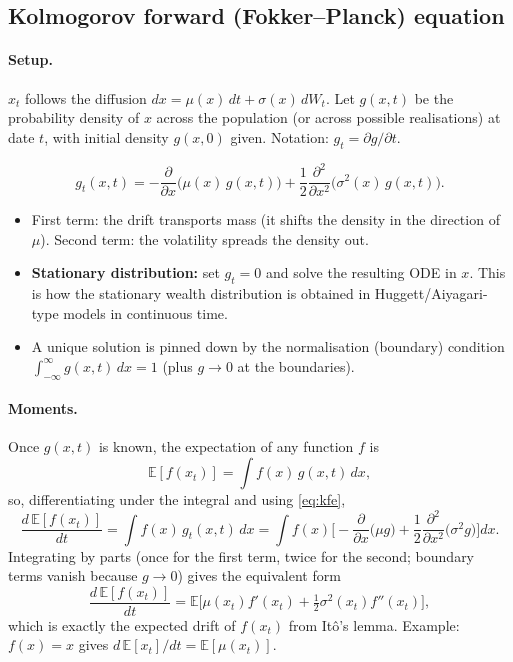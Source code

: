 \subsection{Kolmogorov forward (Fokker--Planck) equation }

\paragraph{Setup.} $x_t$ follows the diffusion $dx=\mu(x)\,dt+\sigma(x)\,dW_t$. Let $g(x,t)$ be the probability density of $x$ across the population (or across possible realisations) at date $t$, with initial density $g(x,0)$ given. Notation: $g_t=\partial g/\partial t$.

\begin{keybox}[title={Kolmogorov forward equation (KFE, also called Fokker--Planck, KFP)}]
\begin{equation}\label{eq:kfe}
g_t(x,t)=-\frac{\partial}{\partial x}\big(\mu(x)\,g(x,t)\big)+\frac12\frac{\partial^2}{\partial x^2}\big(\sigma^2(x)\,g(x,t)\big).
\end{equation}
\end{keybox}
\begin{itemize}
\item First term: the drift transports mass (it shifts the density in the direction of $\mu$). Second term: the volatility spreads the density out.
\item \textbf{Stationary distribution:} set $g_t=0$ and solve the resulting ODE in $x$. This is how the stationary wealth distribution is obtained in Huggett/Aiyagari-type models in continuous time.
\item A unique solution is pinned down by the normalisation (boundary) condition $\int_{-\infty}^{\infty}g(x,t)\,dx=1$ (plus $g\to0$ at the boundaries).
\end{itemize}

\paragraph{Moments.} Once $g(x,t)$ is known, the expectation of any function $f$ is
\[
\mathbb{E}[f(x_t)]=\int f(x)\,g(x,t)\,dx,
\]
so, differentiating under the integral and using \eqref{eq:kfe},
\begin{equation}\label{eq:kfe-moment}
\frac{d\,\mathbb{E}[f(x_t)]}{dt}=\int f(x)\,g_t(x,t)\,dx=\int f(x)\Big[-\frac{\partial}{\partial x}\big(\mu g\big)+\frac12\frac{\partial^2}{\partial x^2}\big(\sigma^2g\big)\Big]dx.
\end{equation}
Integrating by parts (once for the first term, twice for the second; boundary terms vanish because $g\to0$) gives the equivalent form
\[
\frac{d\,\mathbb{E}[f(x_t)]}{dt}=\mathbb{E}\Big[\mu(x_t)f'(x_t)+\tfrac12\sigma^2(x_t)f''(x_t)\Big],
\]
which is exactly the expected drift of $f(x_t)$ from It\^o's lemma. Example: $f(x)=x$ gives $d\,\mathbb{E}[x_t]/dt=\mathbb{E}[\mu(x_t)]$.

